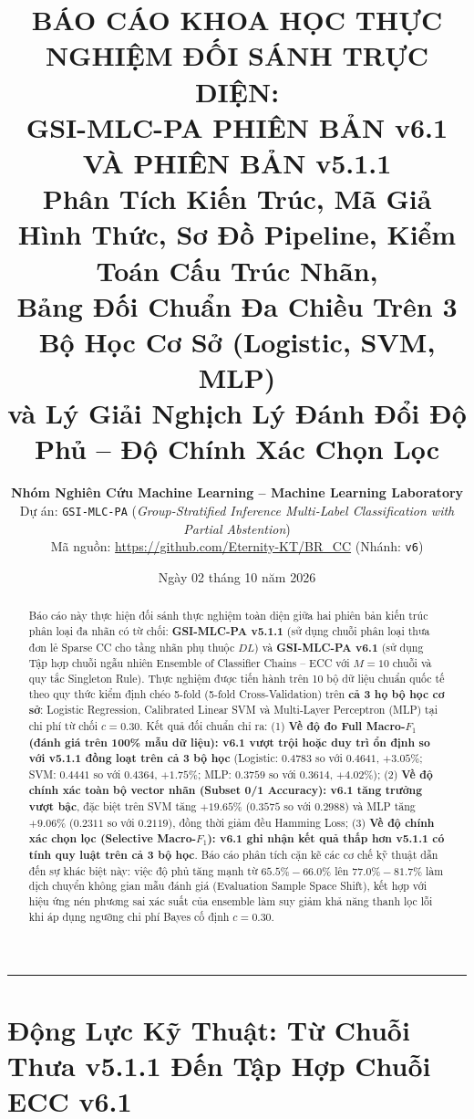 \documentclass[11pt,a4paper]{article}
\title{\textbf{\LARGE BÁO CÁO KHOA HỌC THỰC NGHIỆM ĐỐI SÁNH TRỰC DIỆN:\\ GSI-MLC-PA PHIÊN BẢN v6.1 VÀ PHIÊN BẢN v5.1.1}\\[0.5em]
\Large Phân Tích Kiến Trúc, Mã Giả Hình Thức, Sơ Đồ Pipeline, Kiểm Toán Cấu Trúc Nhãn,\\
Bảng Đối Chuẩn Đa Chiều Trên 3 Bộ Học Cơ Sở (Logistic, SVM, MLP)\\
và Lý Giải Nghịch Lý Đánh Đổi Độ Phủ -- Độ Chính Xác Chọn Lọc}
\author{\textbf{Nhóm Nghiên Cứu Machine Learning -- Machine Learning Laboratory}\\
Dự án: \texttt{GSI-MLC-PA} (\textit{Group-Stratified Inference Multi-Label Classification with Partial Abstention})\\
Mã nguồn: \url{https://github.com/Eternity-KT/BR_CC} (Nhánh: \texttt{v6})}
\date{Ngày 02 tháng 10 năm 2026}
\begin{document}
\maketitle

\begin{abstract}
Báo cáo này thực hiện đối sánh thực nghiệm toàn diện giữa hai phiên bản kiến trúc phân loại đa nhãn có từ chối: \textbf{GSI-MLC-PA v5.1.1} (sử dụng chuỗi phân loại thưa đơn lẻ Sparse CC cho tầng nhãn phụ thuộc $DL$) và \textbf{GSI-MLC-PA v6.1} (sử dụng Tập hợp chuỗi ngẫu nhiên Ensemble of Classifier Chains -- ECC với $M=10$ chuỗi và quy tắc Singleton Rule). Thực nghiệm được tiến hành trên 10 bộ dữ liệu chuẩn quốc tế theo quy thức kiểm định chéo 5-fold (5-fold Cross-Validation) trên \textbf{cả 3 họ bộ học cơ sở}: Logistic Regression, Calibrated Linear SVM và Multi-Layer Perceptron (MLP) tại chi phí từ chối $c = 0.30$. Kết quả đối chuẩn chỉ ra: (1) \textbf{Về độ đo Full Macro-$F_1$ (đánh giá trên 100\% mẫu dữ liệu): v6.1 vượt trội hoặc duy trì ổn định so với v5.1.1 đồng loạt trên cả 3 bộ học} (Logistic: $0.4783$ so với $0.4641$, $+3.05\%$; SVM: $0.4441$ so với $0.4364$, $+1.75\%$; MLP: $0.3759$ so với $0.3614$, $+4.02\%$); (2) \textbf{Về độ chính xác toàn bộ vector nhãn (Subset 0/1 Accuracy): v6.1 tăng trưởng vượt bậc}, đặc biệt trên SVM tăng $+19.65\%$ ($0.3575$ so với $0.2988$) và MLP tăng $+9.06\%$ ($0.2311$ so với $0.2119$), đồng thời giảm đều Hamming Loss; (3) \textbf{Về độ chính xác chọn lọc (Selective Macro-$F_1$): v6.1 ghi nhận kết quả thấp hơn v5.1.1 có tính quy luật trên cả 3 bộ học}. Báo cáo phân tích cặn kẽ các cơ chế kỹ thuật dẫn đến sự khác biệt này: việc độ phủ tăng mạnh từ $65.5\% - 66.0\%$ lên $77.0\% - 81.7\%$ làm dịch chuyển không gian mẫu đánh giá (Evaluation Sample Space Shift), kết hợp với hiệu ứng nén phương sai xác suất của ensemble làm suy giảm khả năng thanh lọc lỗi khi áp dụng ngưỡng chi phí Bayes cố định $c = 0.30$.
\end{abstract}

\vspace{0.8em}
\hrule
\vspace{1.2em}

\section{Động Lực Kỹ Thuật: Từ Chuỗi Thưa v5.1.1 Đến Tập Hợp Chuỗi ECC v6.1}
\end{document}
